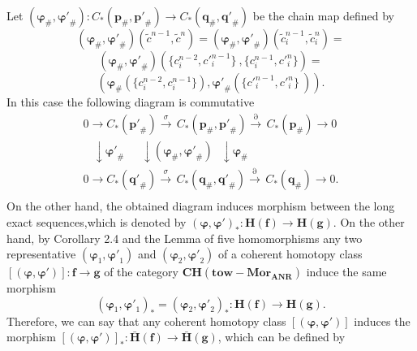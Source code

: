 \documentclass[10pt]{article}
\theoremstyle{definition}
\begin{document}
Let $( {{\mathbf{\varphi }}_{\#}},\mathbf{{\varphi}'}_{\#} ):{{C}_{*}}( {{\mathbf{p}}_{\#}},\mathbf{p'}_{\#})\to {{C}_{*}}( {{\mathbf{q}}_{\#}},\mathbf{q'}_{\#})$ be the chain map defined by
	$$( {{\mathbf{\varphi }}_{\#}},\mathbf{{\varphi}'}_{\#})( {{{\tilde{c}}}^{n-1}},{{{\tilde{c}}}^{n}} )=( {{\mathbf{\varphi }}_{\#}},\mathbf{{\varphi}'}_{\#} )( { \tilde{c}_{i}^{n-1} },{ \tilde{c}_{i}^{n} } )=$$
	$$( {{\mathbf{\varphi }}_{\#}},\mathbf{{\varphi}'}_{\#} )( \{c_{i}^{n-2},{c'}_{i}^{n-1}\}~,\{c_{i}^{n-1},{c'}_{i}^{n}\} )=$$
$$( {{\mathbf{\varphi }}_{\#}}(\{c_{i}^{n-2}, c_{i}^{n-1} \}),\mathbf{{\varphi}'}_{\#}(\{{c'}_{i}^{n-1},{c'}_{i}^{n} \}~) ) .$$                     
In this case the following diagram is commutative
$$
\begin{matrix}
   0\to {{C}_{*}}\left( \mathbf{p'}_{\#} \right)\overset{\sigma }{\mathop{\to }}\,{{C}_{*}}\left( {{\mathbf{p}}_{\#}},\mathbf{p'}_{\#} \right)\overset{\partial }{\mathop{\to }}\,{{C}_{*}}\left( {{\mathbf{p}}_{\#}} \right)\to 0  \\
   ~~~~\downarrow \mathbf{{\varphi}' }_{\#~}~~~~~~\downarrow \left( {{\mathbf{\varphi }}_{\#}},\mathbf{{\varphi}' }_{\#} \right)~~~\downarrow {{\mathbf{\varphi }}_{\#}}  \\
   0\to {{C}_{*}}\left( \mathbf{q'}_{\#} \right)\overset{\sigma }{\mathop{\to }}\,{{C}_{*}}\left( {{\mathbf{q}}_{\#}},\mathbf{q'}_{\#} \right)\overset{\partial }{\mathop{\to }}\,{{C}_{*}}\left( {{\mathbf{q}}_{\#}} \right)\to 0.  \\
\end{matrix}
$$
On the other hand, the obtained diagram induces morphism between the long exact sequences,which is denoted by ${{( \mathbf{\varphi },\mathbf{{\varphi }'} )}_{*}}:\mathbf{{H}}( \mathbf{f} ) \to  \mathbf{{H}}( \mathbf{g} )$. On the other hand, by Corollary 2.4 \cite{1901} and the Lemma of five homomorphisms any two representative $( {{\mathbf{\varphi }}_{1}},\mathbf{\varphi' }_{1} )$ and $( {{\mathbf{\varphi }}_{2}},\mathbf{\varphi' }_{2})$ of a coherent homotopy class $\left[ ( \mathbf{\varphi },\mathbf{{\varphi }'} ) \right]:\mathbf{f}\to \mathbf{g}$ of the category $\mathbf{CH}( \mathbf{tow}-\mathbf{Mo}{{\mathbf{r}}_{\mathbf{ANR}}} )$ induce the same morphism
$${{( {{\mathbf{\varphi }}_{1}},\mathbf{{\varphi}' }_{1} )}_{*}}={{( {{\mathbf{\varphi }}_{2}},\mathbf{{\varphi}' }_{2} )}_{*}}:\mathbf{{H}}( \mathbf{f} )\to \mathbf{{H}}( \mathbf{g} ).$$                 
Therefore, we can say that any coherent homotopy class $\left[ ( \mathbf{\varphi },\mathbf{{\varphi }'} ) \right]$ induces  the morphism  ${{\left[ ( \mathbf{\varphi },\mathbf{{\varphi }'} ) \right]}_{*}}:\mathbf{\bar{H}}( \mathbf{f} )\to \mathbf{\bar{H}}{{( \mathbf{g} )}}$, which can be defined by
\end{document}
